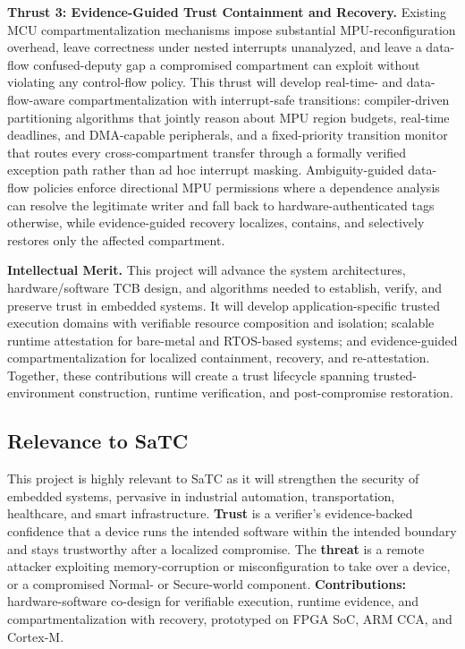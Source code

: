 \textbf{Thrust 3: Evidence-Guided Trust Containment and Recovery.}
Existing MCU compartmentalization mechanisms impose substantial MPU-reconfiguration overhead, leave correctness under nested interrupts unanalyzed, and leave a data-flow confused-deputy gap a compromised compartment can exploit without violating any control-flow policy.
This thrust will develop real-time- and data-flow-aware compartmentalization with interrupt-safe transitions: compiler-driven partitioning algorithms that jointly reason about MPU region budgets, real-time deadlines, and DMA-capable peripherals, and a fixed-priority transition monitor that routes every cross-compartment transfer through a formally verified exception path rather than ad hoc interrupt masking.
Ambiguity-guided data-flow policies enforce directional MPU permissions where a dependence analysis can resolve the legitimate writer and fall back to hardware-authenticated tags otherwise, while evidence-guided recovery localizes, contains, and selectively restores only the affected compartment.

\textbf{Intellectual Merit.}
This project will advance the system architectures, hardware/software TCB design, and algorithms needed to establish, verify, and preserve trust in embedded systems.
It will develop application-specific trusted execution domains with verifiable resource composition and isolation; scalable runtime attestation for bare-metal and RTOS-based systems; and evidence-guided compartmentalization for localized containment, recovery, and re-attestation. 
Together, these contributions will create a trust lifecycle spanning trusted-environment construction, runtime verification, and post-compromise restoration.

\subsection{Relevance to SaTC}
This project is highly relevant to SaTC as it will strengthen the security of embedded systems, pervasive in industrial automation, transportation, healthcare, and smart infrastructure.
\textbf{Trust} is a verifier's evidence-backed confidence that a device runs the intended software within the intended boundary and stays trustworthy after a localized compromise.
The \textbf{threat} is a remote attacker exploiting memory-corruption or misconfiguration to take over a device, or a compromised Normal- or Secure-world component.
\textbf{Contributions:} hardware-software co-design for verifiable execution, runtime evidence, and compartmentalization with recovery, prototyped on FPGA SoC, ARM CCA, and Cortex-M.

